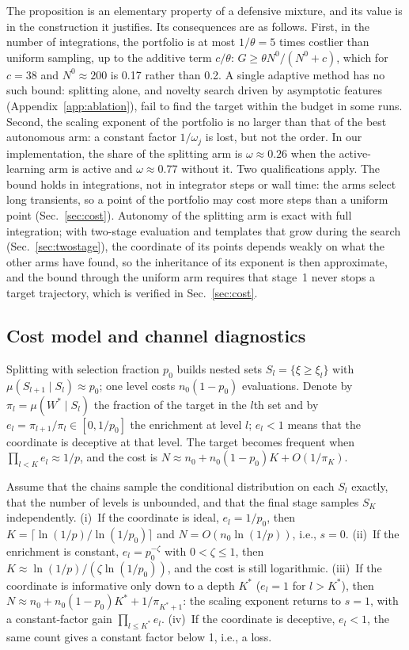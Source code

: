 The proposition is an elementary property of a defensive mixture, and its value is in the construction it justifies. Its consequences are as follows. First, in the number of integrations, the portfolio is at most $1/\theta=5$ times costlier than uniform sampling, up to the additive term $c/\theta$: $G\ge\theta N^0/(N^0+c)$, which for $c=38$ and $N^0\approx200$ is 0.17 rather than 0.2. A single adaptive method has no such bound: splitting alone, and novelty search driven by asymptotic features (Appendix~\ref{app:ablation}), fail to find the target within the budget in some runs. Second, the scaling exponent of the portfolio is no larger than that of the best autonomous arm: a constant factor $1/\omega_j$ is lost, but not the order. In our implementation, the share of the splitting arm is $\omega\approx0.26$ when the active-learning arm is active and $\omega\approx0.77$ without it. Two qualifications apply. The bound holds in integrations, not in integrator steps or wall time: the arms select long transients, so a point of the portfolio may cost more steps than a uniform point (Sec.~\ref{sec:cost}). Autonomy of the splitting arm is exact with full integration; with two-stage evaluation and templates that grow during the search (Sec.~\ref{sec:twostage}), the coordinate of its points depends weakly on what the other arms have found, so the inheritance of its exponent is then approximate, and the bound through the uniform arm requires that stage~1 never stops a target trajectory, which is verified in Sec.~\ref{sec:cost}.

\subsection{Cost model and channel diagnostics}\label{sec:costmodel}

Splitting with selection fraction $p_0$ builds nested sets $S_l=\{\xi\ge\xi_l\}$ with $\mu(S_{l+1}\mid S_l)\approx p_0$; one level costs $n_0(1-p_0)$ evaluations. Denote by $\pi_l=\mu(W^*\mid S_l)$ the fraction of the target in the $l$th set and by $e_l=\pi_{l+1}/\pi_l\in[0,1/p_0]$ the enrichment at level $l$; $e_l<1$ means that the coordinate is deceptive at that level. The target becomes frequent when $\prod_{l<K}e_l\approx1/p$, and the cost is $N\approx n_0+n_0(1-p_0)K+O(1/\pi_K)$.

\begin{proposition}\label{prop:cost}
Assume that the chains sample the conditional distribution on each $S_l$ exactly, that the number of levels is unbounded, and that the final stage samples $S_K$ independently. (i)~If the coordinate is ideal, $e_l=1/p_0$, then $K=\lceil\ln(1/p)/\ln(1/p_0)\rceil$ and $N=O(n_0\ln(1/p))$, i.e., $s=0$. (ii)~If the enrichment is constant, $e_l=p_0^{-\zeta}$ with $0<\zeta\le1$, then $K\approx\ln(1/p)/(\zeta\ln(1/p_0))$, and the cost is still logarithmic. (iii)~If the coordinate is informative only down to a depth $K^*$ ($e_l=1$ for $l>K^*$), then $N\approx n_0+n_0(1-p_0)K^*+1/\pi_{K^*+1}$: the scaling exponent returns to $s=1$, with a constant-factor gain $\prod_{l\le K^*}e_l$. (iv)~If the coordinate is deceptive, $e_l<1$, the same count gives a constant factor below 1, i.e., a loss.
\end{proposition}

